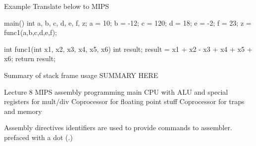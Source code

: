 \documentclass{article}
\begin{document}
	Example
		Translate below to MIPS

		main(){
			int a, b, c, d, e, f, z;
			a = 10; b = -12; c = 120; d = 18; e = -2; f = 23;
			z = func1(a,b,c,d,e,f);
		}

		int func1(int x1, x2, x3, x4, x5, x6){
			int result;
			result = x1 + x2 - x3 + x4 + x5 + x6;
			return result;
		}

	Summary of stack frame usage
		SUMMARY HERE

Lecture 8
	MIPS assembly programming
		main CPU with ALU and special registers for mult/div
		Coprocessor for floating point stuff
		Coprocessor for traps and memory

		Assembly directives
			identifiers are used to provide commands to assembler.
			prefaced with a dot (.)
\end{document}
